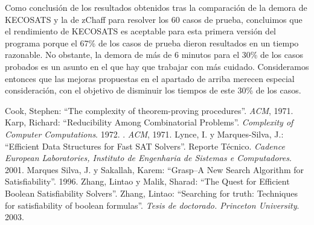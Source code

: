 \documentclass[12pt,lettersize,oneside]{article}
\begin{document}
Como conclusión de los resultados obtenidos tras la comparación de la demora de
KECOSATS y la de zChaff para resolver los 60 casos de prueba, concluimos que el
rendimiento de KECOSATS es aceptable para esta primera versión del programa
porque el 67\% de los casos de prueba dieron resultados en un tiempo
razonable. No obstante, la demora de más de 6 minutos para el 30\% de los casos
probados es un asunto en el que hay que trabajar con más cuidado. Consideramos
entonces que las mejoras propuestas en el apartado de arriba merecen especial
consideración, con el objetivo de disminuir los tiempos de este 30\% de los
casos.

\begin{thebibliography}{99}
Cook, Stephen: ``The complexity of theorem-proving
  procedures''. \emph{ACM}, 1971.
Karp, Richard: ``Reducibility Among Combinatorial
  Problems''. \emph{Complexity of Computer Computations}. 1972.
  . \emph{ACM}, 1971.
Lynce, I. y Marques-Silva, J.: ``Efficient Data Structures for
  Fast SAT Solvers''. Reporte Técnico. \emph{Cadence European Laboratories,
    Instituto de Engenharia de Sistemas e Computadores}. 2001.
Marques Silva, J. y Sakallah, Karem: ``Grasp--A New Search
  Algorithm for Satisfiability''. 1996.
Zhang, Lintao y Malik, Sharad: ``The Quest for Efficient Boolean
  Satisfiability Solvers''.
Zhang, Lintao: ``Searching for truth: Techniques for
  satisfiability of boolean formulas''. \emph{Tesis de doctorado. Princeton
    University}. 2003.
\end{thebibliography}
\end{document}
